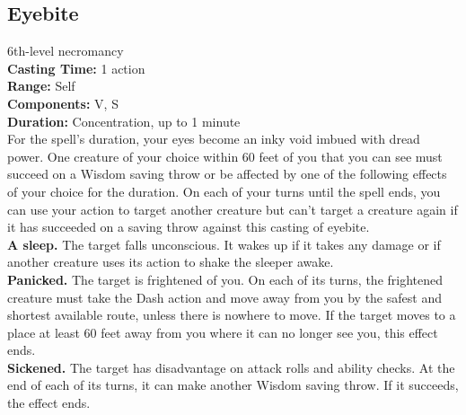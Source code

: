 \documentclass[11pt, A4paper, english]{article}
\begin{document}
		\subsection{Eyebite}
6th-level necromancy \\
\textbf{Casting Time:} 1 action \\
\textbf{Range:} Self \\
\textbf{Components:} V, S \\
\textbf{Duration:} Concentration, up to 1 minute \\
For the spell’s duration, your eyes become an inky void imbued with dread power. One creature of your choice within 60 feet of you that you can see must succeed on a Wisdom  saving throw or be affected by one of the following effects of your choice for the duration. On each of your turns until the spell ends, you can use your action to target another creature but can’t target a creature again if it has succeeded on a saving throw against this casting of eyebite. \\
\textbf{A sleep.} The target falls unconscious. It wakes up if it takes any damage or if another creature uses its action to shake the sleeper awake. \\
\textbf{Panicked.} The target is frightened of you. On each of its turns, the frightened creature must take the Dash action and move away from you by the safest and shortest available route, unless there is nowhere to move. If the target moves to a place at least 60 feet away from you where it can no longer see you, this effect ends. \\
\textbf{Sickened.} The target has disadvantage on attack rolls and ability checks. At the end of each of its turns, it can make another Wisdom saving throw. If it succeeds, the effect ends.
\end{document}

